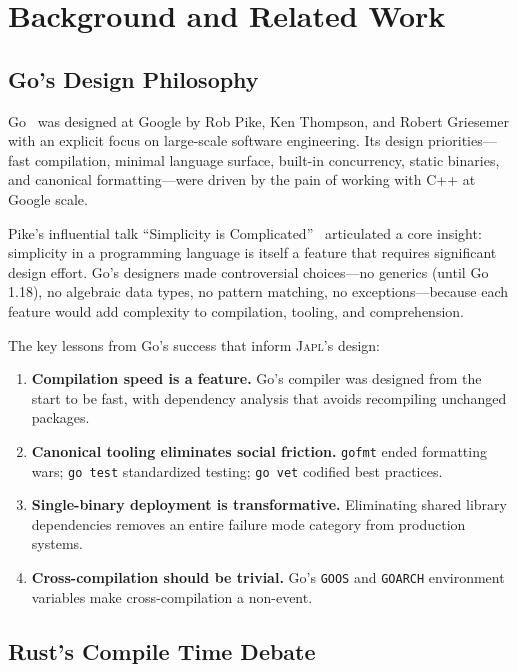 \documentclass[11pt,twocolumn]{article}
\newcommand{\japl}{\textsc{Japl}}
\begin{document}
\section{Background and Related Work}
\label{sec:background}

\subsection{Go's Design Philosophy}

Go~\citep{pike2012go,donovan2015go} was designed at Google by Rob Pike, Ken Thompson, and Robert Griesemer with an explicit focus on large-scale software engineering.
Its design priorities---fast compilation, minimal language surface, built-in concurrency, static binaries, and canonical formatting---were driven by the pain of working with C++ at Google scale.

Pike's influential talk ``Simplicity is Complicated''~\citep{pike2015simplicity} articulated a core insight: simplicity in a programming language is itself a feature that requires significant design effort.
Go's designers made controversial choices---no generics (until Go 1.18), no algebraic data types, no pattern matching, no exceptions---because each feature would add complexity to compilation, tooling, and comprehension.

The key lessons from Go's success that inform \japl{}'s design:
\begin{enumerate}[leftmargin=*]
\item \textbf{Compilation speed is a feature.} Go's compiler was designed from the start to be fast, with dependency analysis that avoids recompiling unchanged packages.
\item \textbf{Canonical tooling eliminates social friction.} \texttt{gofmt} ended formatting wars; \texttt{go test} standardized testing; \texttt{go vet} codified best practices.
\item \textbf{Single-binary deployment is transformative.} Eliminating shared library dependencies removes an entire failure mode category from production systems.
\item \textbf{Cross-compilation should be trivial.} Go's \texttt{GOOS} and \texttt{GOARCH} environment variables make cross-compilation a non-event.
\end{enumerate}

\subsection{Rust's Compile Time Debate}
\end{document}
